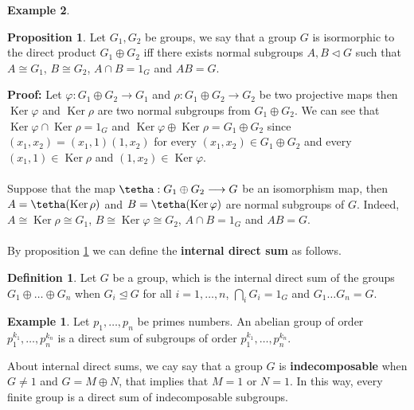 \documentclass[11pt]{amsbook}%
\theoremstyle{plain}
\theoremstyle{definition}
\newtheorem{definition*}{Definition}
\newtheorem*{example*}{Example}
\newtheorem{proposition}[theorem]{Proposition}
\numberwithin{equation}{section}
\DeclareMathOperator{\Ker}{Ker}
\newcommand{\leftnormal}{\trianglelefteq}
\begin{document}
\begin{example*}
\begin{proposition}
  \label{prop-8}
  Let $G_{1}, G_{2}$ be groups, we say that a group $G$ is isormorphic
  to the direct product $G_{1} \oplus G_{2}$ iff there exists
  normal subgroups $A, B \lhd G$ such that
  $A \cong G_{1}$, $B \cong G_{2}$, $A \cap B = 1_{G}$
  and $AB = G$.
\end{proposition} \vspace{1.8em}
\textbf{Proof: }Let $\varphi: G_{1} \oplus G_{2} \longrightarrow G_{1}$ and
$\rho: G_{1} \oplus G_{2} \longrightarrow G_{2}$ be two projective maps
then $\Ker \varphi$ and $\Ker \rho$ are two normal subgroups
from $G_{1} \oplus G_{2}$. We can see that $\Ker \varphi \cap \Ker \rho = 1_{G}$
and $\Ker \varphi \oplus \Ker \rho = G_{1} \oplus G_{2}$
since $(x_{1}, x_{2}) = (x_{1}, 1)(1, x_{2})$ for every $(x_{1}, x_{2}) \in G_{1} \oplus G_{2}$
and every $(x_{1}, 1 ) \in \Ker \rho$ and $(1, x_{2}) \in \Ker \varphi$. \\ \\
Suppose that the map $\tetha: G_{1} \oplus G_{2} \longrightarrow G$
be an isomorphism map, then $A = \tetha(\Ker \rho)$ and $B = \tetha(\Ker \varphi)$
are normal subgroups of $G$. Indeed, $A \cong \Ker \rho \cong G_{1}$,
$B \cong \Ker \varphi \cong G_{2}$, $A \cap B = 1_{G}$ and $AB = G$. \qedsymbol \\ \\
By proposition \ref{prop-8} we can define the \textbf{internal direct sum} as follows.
\begin{definition*}
  \label{def-internal-sum}
  Let $G$ be a group, which is the internal direct sum of the groups $G_{1} \oplus \dots \oplus G_{n}$
  when $G_{i} \leftnormal G$ for all $i = 1, \dots, n$, $\bigcap_{i} G_{i} = 1_{G}$ and $G_{1}  \dots G_{n} = G$.
\end{definition*}
\begin{example*}
  \label{exam-direct-sum}
  Let $p_{1}, \dots, p_{n}$ be primes numbers. An abelian group of order $p_{1}^{k_{1}}, \dots, p_{n}^{k_{n}}$
  is a direct sum of subgroups of order $p_{1}^{k_{1}}, \dots, p_{n}^{k_{n}}$.
\end{example*}
About internal direct sums, we cay say that a group $G$ is \textbf{indecomposable} when
$G \neq 1$ and $G = M \oplus N$, that implies that $M = 1$ or $N = 1$. In this way,
every finite group is a direct sum of indecomposable subgroups.


\end{example*}
\end{document}
